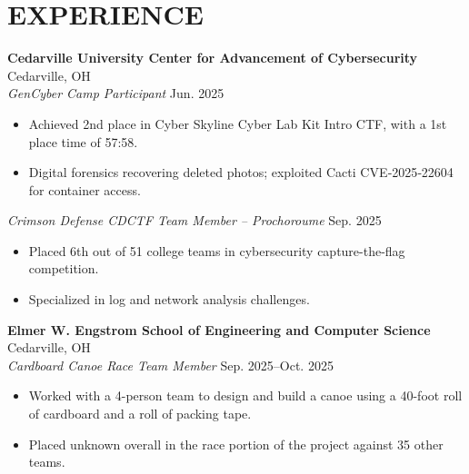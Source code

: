 \documentclass[a4paper,10pt]{article}
\newlength{\mpwidth}
\begin{document}

\section{EXPERIENCE}

\textbf{Cedarville University Center for Advancement of Cybersecurity} \hfill Cedarville, OH\\
\textit{GenCyber Camp Participant} \hfill Jun. 2025
\begin{minipage}{\mpwidth}
\begin{itemize}[nosep,after=\strut, leftmargin=1em, itemsep=3pt,label=--]
\item Achieved 2nd place in Cyber Skyline Cyber Lab Kit Intro CTF, with a 1st place time of 57:58.
\item Digital forensics recovering deleted photos; exploited Cacti CVE‑2025‑22604 for container access.
\end{itemize}
\end{minipage}

\textit{Crimson Defense CDCTF Team Member -- Prochoroume} \hfill Sep. 2025
\begin{minipage}{\mpwidth}
\begin{itemize}[nosep,after=\strut, leftmargin=1em, itemsep=3pt,label=--]
\item Placed 6th out of 51 college teams in cybersecurity capture-the-flag competition.
\item Specialized in log and network analysis challenges.
\end{itemize}
\end{minipage}

\textbf{Elmer W. Engstrom School of Engineering and Computer Science} \hfill Cedarville, OH\\
\textit{Cardboard Canoe Race Team Member} \hfill Sep. 2025--Oct. 2025
\begin{minipage}{\mpwidth}
\begin{itemize}[nosep,after=\strut, leftmargin=1em, itemsep=3pt,label=--]
\item Worked with a 4-person team to design and build a canoe using a 40-foot roll of cardboard and a roll of packing tape.
\item Placed unknown overall in the race portion of the project against 35 other teams.
\end{itemize}
\end{minipage}
\end{document}
